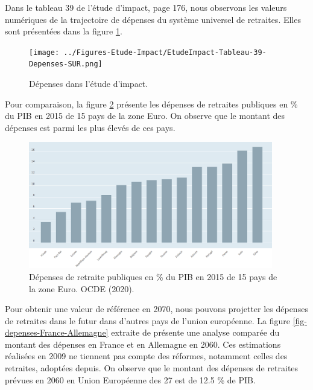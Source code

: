 \documentclass[10pt]{article}
\begin{document}
Dans le tableau 39 de l'étude d'impact, page 176, nous observons les valeurs numériques de la trajectoire de dépenses du système universel de retraites. 
Elles sont présentées dans la figure \ref{fig-depenses-etude-impact}.

\begin{figure}
\begin{center}
\texttt{[image: ../Figures-Etude-Impact/EtudeImpact-Tableau-39-Depenses-SUR.png]}
\end{center}
\caption{Dépenses dans l'étude d'impact.}
\label{fig-depenses-etude-impact}
\end{figure}

Pour comparaison, la figure \ref{fig-depenses-UE-15-2020} présente les dépenses de retraites 
publiques en \% du PIB en 2015 de 15 pays de la zone Euro.  
On observe que le montant des dépenses est parmi les plus élevés de ces pays. 

\begin{figure}
\begin{center}
\includegraphics[width=0.95\textwidth]{Depenses-retraites-2015-UE-15.png}
\end{center}
\caption{Dépenses de retraite publiques en \% du PIB en 2015 de 15 pays de la zone Euro. 
OCDE (2020). }
\label{fig-depenses-UE-15-2020}
\end{figure}

Pour obtenir une valeur de référence en 2070, nous pouvons projetter les dépenses de 
retraites dans le futur dans d'autres pays de l'union européenne.  
La figure \ref{fig-depenses-France-Allemagne} extraite 
de \cite{ProspectiveSenat} présente une analyse 
comparée du montant des dépenses en France et en Allemagne en 2060. 
Ces estimations réalisées en 2009 ne tiennent pas compte des réformes, 
notamment celles des retraites, adoptées depuis. 
On observe que le montant des dépenses de retraites prévues en 2060 
en Union Européenne des 27 est de 12.5 \% de PIB.
\end{document}
